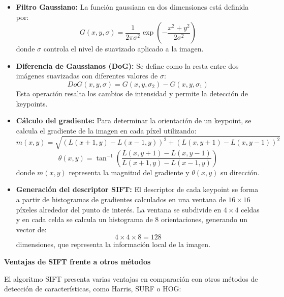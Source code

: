 \documentclass[a4paper]{article}
\begin{document}
  \begin{itemize}
      \item \textbf{Filtro Gaussiano:}  
      La función gaussiana en dos dimensiones está definida por:
      \[
      G(x, y, \sigma) = \frac{1}{2\pi\sigma^2} \exp\left(-\frac{x^2 + y^2}{2\sigma^2}\right)
      \]
      donde \(\sigma\) controla el nivel de suavizado aplicado a la imagen.
      
      \item \textbf{Diferencia de Gaussianos (DoG):}  
      Se define como la resta entre dos imágenes suavizadas con diferentes valores de \(\sigma\):
      \[
      DoG(x, y, \sigma) = G(x, y, \sigma_2) - G(x, y, \sigma_1)
      \]
      Esta operación resalta los cambios de intensidad y permite la detección de keypoints.
      
      \item \textbf{Cálculo del gradiente:}  
      Para determinar la orientación de un keypoint, se calcula el gradiente de la imagen en cada píxel utilizando:
      \[
      m(x, y) = \sqrt{(L(x+1, y) - L(x-1, y))^2 + (L(x, y+1) - L(x, y-1))^2}
      \]
      \[
      \theta(x, y) = \tan^{-1} \left(\frac{L(x, y+1) - L(x, y-1)}{L(x+1, y) - L(x-1, y)}\right)
      \]
      donde \(m(x, y)\) representa la magnitud del gradiente y \(\theta(x, y)\) su dirección.
      
      \item \textbf{Generación del descriptor SIFT:}  
      El descriptor de cada keypoint se forma a partir de histogramas de gradientes calculados en una ventana de \(16\times16\) píxeles alrededor del punto de interés. La ventana se subdivide en \(4\times4\) celdas y en cada celda se calcula un histograma de 8 orientaciones, generando un vector de:
      \[
      4 \times 4 \times 8 = 128
      \]
      dimensiones, que representa la información local de la imagen.
  \end{itemize}
  
  \par\vspace{0.5cm}
  \textbf{Ventajas de SIFT frente a otros métodos}
  \par\vspace{0.5cm}
  
  El algoritmo SIFT presenta varias ventajas en comparación con otros métodos de detección de características, como Harris, SURF o HOG:
  
\end{document}
